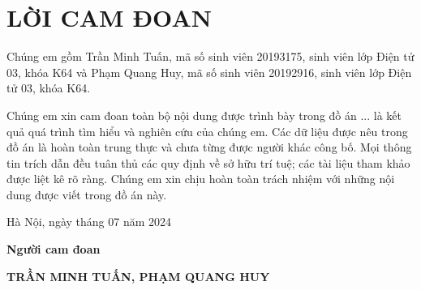 \section*{LỜI CAM ĐOAN} %
\thispagestyle{empty}

Chúng em gồm Trần Minh Tuấn, mã số sinh viên 20193175, sinh viên lớp Điện tử 03, khóa K64 và Phạm Quang Huy, mã số sinh viên 20192916, sinh viên lớp Điện tử 03, khóa K64.

Chúng em xin cam đoan toàn bộ nội dung được trình bày trong đồ án ... là kết quả quá trình tìm hiểu và
nghiên cứu của chúng em. Các dữ liệu được nêu trong đồ án là hoàn toàn trung thực
và chưa từng được người khác công bố. Mọi thông tin trích dẫn đều tuân thủ các quy
định về sở hữu trí tuệ; các tài liệu tham khảo được liệt kê rõ ràng. Chúng em xin
chịu hoàn toàn trách nhiệm với những nội dung được viết trong đồ án này.


\vspace{6pt}

\hspace{8cm}Hà Nội, ngày  tháng 07 năm 2024

\hspace{9cm}\textbf{Người cam đoan}

\vspace{1cm}
\hspace{7cm}\textbf{TRẦN MINH TUẤN,  PHẠM QUANG HUY}

\cleardoublepage
